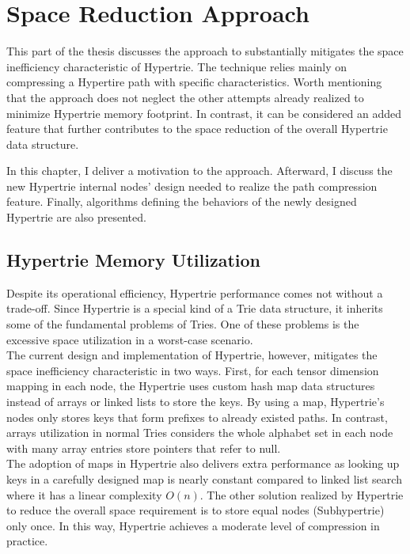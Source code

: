 \chapter{Space Reduction Approach}
\label{ch:approach}

This part of the thesis discusses the approach to substantially mitigates the space inefficiency characteristic of Hypertrie.  
The technique relies mainly on compressing a Hypertire path with specific characteristics. 
Worth mentioning that the approach does not neglect the other attempts already realized to minimize Hypertrie memory footprint. 
In contrast, it can be considered an added feature that further contributes to the space reduction of the overall Hypertrie data structure. 


In this chapter, I deliver a motivation to the approach. Afterward, I discuss the new Hypertrie internal nodes' design needed to realize the path compression feature. Finally, algorithms defining the behaviors of the newly designed Hypertrie are also presented. 


\section{Hypertrie Memory Utilization}

Despite its operational efficiency, Hypertrie performance comes not without a trade-off. 
Since Hypertrie is a special kind of a Trie data structure, it inherits some of the fundamental problems of  Tries. 
One of these problems is the excessive space utilization in a worst-case scenario.  \\


The current design and implementation of Hypertrie, however, mitigates the space inefficiency characteristic in two ways. 
First, for each tensor dimension mapping in each node, the Hypertrie uses custom hash map data structures instead of arrays or linked lists to store the keys. 
By using a map, Hypertrie's nodes only stores keys that form prefixes to already existed paths. 
In contrast, arrays utilization in normal Tries considers the whole alphabet set in each node with many array entries store pointers that refer to null.  \\

The adoption of maps in Hypertrie also delivers extra performance as looking up keys in a carefully designed map is nearly constant compared to linked list search where it has a linear complexity $O(n)$. 
The other solution realized by Hypertrie to reduce the overall space requirement is to store equal nodes (Subhypertrie) only once. In this way, Hypertrie achieves a moderate level of compression in practice. \\

